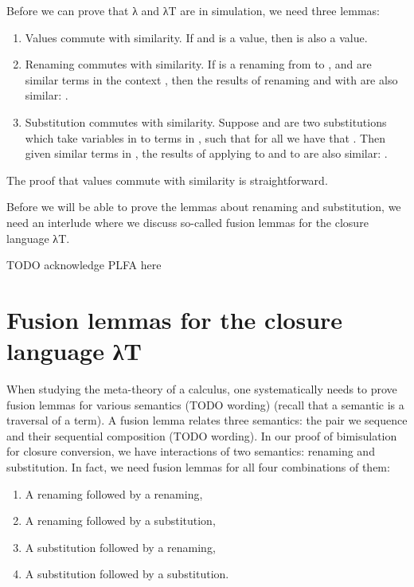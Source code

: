 \documentclass[bsc,frontabs,twoside,singlespacing,parskip,deptreport]{infthesis}
\theoremstyle{definition}
\begin{document}
Before we can prove that λ and λT are in simulation, we need three
lemmas:

\begin{enumerate}
\item
  Values commute with similarity. If  and  is a
  value, then  is also a value.

\item
  Renaming commutes with similarity. If  is a renaming from
   to , and  are similar terms in the context
  , then the results of renaming  and  with 
  are also similar: .

\item
  Substitution commutes with similarity. Suppose  and  are two
  substitutions which take variables  in  to terms in ,
  such that for all  we have that . Then given similar terms  in , the results
  of applying  to  and  to  are also
  similar: .
\end{enumerate}

The proof that values commute with similarity is straightforward.


Before we will be able to prove the lemmas about renaming and substitution, we need an interlude
where we discuss so-called fusion lemmas for the closure language λT.

TODO acknowledge PLFA here


\section{Fusion lemmas for the closure language λT}

When studying the meta-theory of a calculus, one systematically needs
to prove fusion lemmas for various semantics (TODO wording) (recall
that a semantic is a traversal of a term). A fusion
lemma relates three semantics: the pair we sequence and their
sequential composition (TODO wording). In our proof of bimisulation
for closure conversion, we have interactions of two semantics:
renaming and substitution. In fact, we need fusion lemmas for all four
combinations of them:

\begin{enumerate}
  \item A renaming followed by a renaming,
  \item A renaming followed by a substitution,
  \item A substitution followed by a renaming,
  \item A substitution followed by a substitution.
  \end{enumerate}
\end{document}
